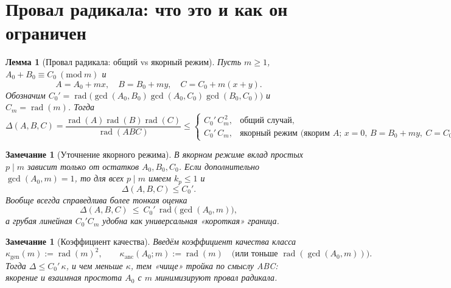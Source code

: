 \documentclass[11pt,a4paper]{article}
\newtheorem{lemma}[definition]{Лемма}
\newtheorem{remark}[definition]{Замечание}
\newcommand{\rad}{\operatorname{rad}}
\begin{document}
\section{Провал радикала: что это и как он ограничен}
\newcommand{\isanchorA}{\text{(якорим $A$;\ $x=0$,\ $B=B_0+my,\ C=C_0+my$)}} %
\begin{lemma}[Провал радикала: общий vs якорный режим]
Пусть $m\ge1$, $A_0+B_0\equiv C_0\ (\mathrm{mod}\ m)$ и
\[
A=A_0+mx,\quad B=B_0+my,\quad C=C_0+m(x+y).
\]
Обозначим $C_0'=\rad\!\big(\gcd(A_0,B_0)\gcd(A_0,C_0)\gcd(B_0,C_0)\big)$ и $C_m=\rad(m)$. Тогда
\[
\Delta(A,B,C)=\frac{\rad(A)\rad(B)\rad(C)}{\rad(ABC)}\le
\begin{cases}
C_0'\,C_m^{\,2}, & \textbf{общий случай},\\[2mm]
C_0'\,C_m, & \textbf{якорный режим }\isanchorA.
\end{cases}
\]
\end{lemma}

\begin{remark}[Уточнение якорного режима]
В якорном режиме вклад простых $p\mid m$ зависит только от остатков $A_0,B_0,C_0$.
Если дополнительно $\gcd(A_0,m)=1$, то для всех $p\mid m$ имеем $k_p\le1$ и
\[
\Delta(A,B,C)\le C_0'. 
\]
Вообще всегда справедлива более тонкая оценка
\[
\Delta(A,B,C)\ \le\ C_0'\,\rad\!\big(\gcd(A_0,m)\big),
\]
а грубая линейная $C_0' C_m$ удобна как универсальная «короткая» граница.
\end{remark}

\begin{remark}[Коэффициент качества]
Введём \emph{коэффициент качества} класса
\[
\kappa_{\mathrm{gen}}(m):=\rad(m)^{2},\qquad 
\kappa_{\mathrm{anc}}(A_0;m):=\rad(m)\quad\text{(или тоньше }\rad(\gcd(A_0,m))\text{)}.
\]
Тогда $\Delta\le C_0'\,\kappa$, и чем меньше $\kappa$, тем «чище» тройка по смыслу ABC:
якорение и взаимная простота $A_0$ с $m$ минимизируют провал радикала.
\end{remark}
\end{document}
